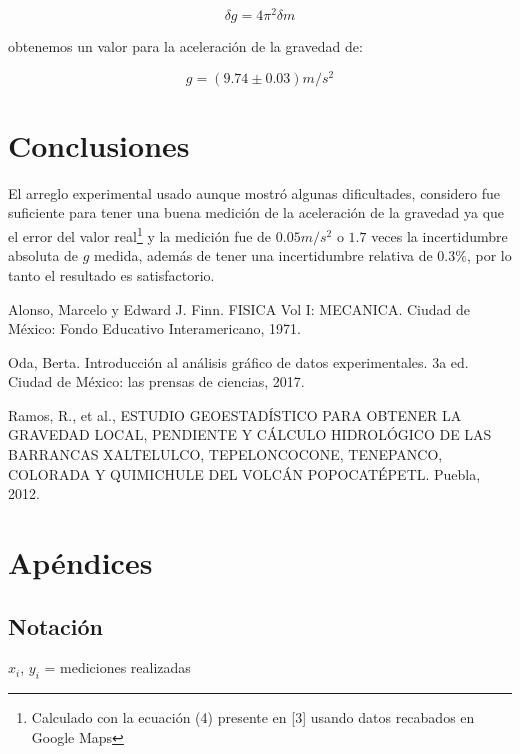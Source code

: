 \documentclass[DIV=calc, paper=a4, fontsize=11pt]{scrartcl}
\begin{document}
\begin{multicols}{2}
\begin{equation*}
    \delta g =  4\pi^2 \delta m
\end{equation*}

\noindent obtenemos un valor para la aceleración de la gravedad de:

\begin{equation*}
    g = (9.74 \pm 0.03) m/s^2
\end{equation*}





\section*{Conclusiones}

El arreglo experimental usado aunque mostró algunas dificultades, considero fue suficiente para tener una buena medición de la aceleración de la gravedad ya que el error del valor real\footnote{Calculado con la ecuación (4) presente en [3] usando datos recabados en Google Maps} y la medición fue de $0.05 m/s^2$ o $1.7$ veces la incertidumbre absoluta de $g$ medida, además de tener una incertidumbre relativa de $0.3\%$, por lo tanto el resultado es satisfactorio.
  
\begin{thebibliography}{99}
 Alonso, Marcelo y Edward J. Finn. FISICA Vol I: MECANICA. Ciudad de México: Fondo Educativo Interamericano, 1971.

 Oda, Berta. Introducción al análisis gráfico de datos experimentales. 3a ed. Ciudad de México: las prensas de ciencias, 2017.

 Ramos, R., et al., ESTUDIO GEOESTADÍSTICO PARA OBTENER LA GRAVEDAD LOCAL, PENDIENTE Y CÁLCULO HIDROLÓGICO DE LAS BARRANCAS XALTELULCO, TEPELONCOCONE, TENEPANCO, COLORADA Y QUIMICHULE DEL VOLCÁN POPOCATÉPETL. Puebla, 2012. 


\end{thebibliography}




\section*{Apéndices}

\subsection*{Notación}

\noindent $x_i$, $y_i$ = mediciones realizadas


\end{multicols}
\end{document}
